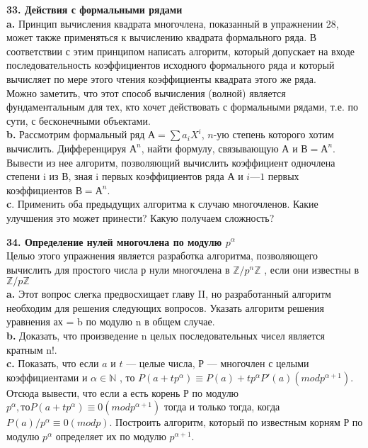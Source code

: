 \documentclass{mai_book}
\begin{document}
\noindent
\textbf{33. Действия с формальными рядами}\\

\textbf{a.} Принцип вычисления квадрата многочлена, показанный в упражнении 28, может также применяться к вычислению квадрата формального ряда. В соответствии с этим принципом написать алгоритм, который допускает на входе последовательность коэффициентов исходного формального ряда и который вычисляет по мере этого чтения коэффициенты квадрата этого же ряда.\\

Можно заметить, что этот способ вычисления (волной) является фундаментальным для тех, кто хочет действовать с формальными рядами, т.е. по сути, с бесконечными объектами.\\
\textbf{b.} Рассмотрим формальный ряд $А = \sum a_{i} X^{i}$, $n$-ую степень которого
хотим вычислить. Дифференцируя $А^{n}$, найти формулу, связывающую А и $В = А^{n}$. Вывести из нее алгоритм, позволяющий вычислить коэффициент одночлена степени i из В, зная i первых коэффициентов ряда А и $i — 1$ первых коэффициентов $В = А^{n}$.\\

\textbf{c}. Применить оба предыдущих алгоритма к случаю многочленов. Какие улучшения это может принести? Какую получаем сложность?
\newpage

\noindent
\textbf{34. Определение нулей многочлена по модулю $p^{\alpha}$ }\\

Целью этого упражнения является разработка алгоритма, позволяющего вычислить для простого числа р нули многочлена в $\mathbb{Z} / p^{n} \mathbb{Z}$ , если они известны в $\mathbb{Z} / p \mathbb{Z}$\\

\textbf{a.} Этот вопрос слегка предвосхищает главу II, но разработанный алгоритм необходим для решения следующих вопросов. Указать алгоритм решения уравнения ах = b по модулю n в общем случае.\\

\textbf{b.} Доказать, что произведение n целых последовательных чисел является кратным n!.\\

\textbf{c.} Показать, что если $a$ и $t$ — целые числа, Р — многочлен с целыми коэффициентами и $\alpha \in \mathbb{N}$ , то $P(a + tp^{\alpha}) \equiv P(a) + tp^{\alpha} P'(a) (mod p^{\alpha + 1})$. Отсюда вывести, что если а есть корень Р по модулю $p^{\alpha}, то P(a + tp^{\alpha}) \equiv 0 (mod p^{\alpha + 1})$ тогда и только тогда, когда $P(a)/p^{\alpha} \equiv 0 (mod p)$. Построить алгоритм, который по известным корням Р по модулю $p^{\alpha}$ определяет их по модулю $p^{\alpha + 1}$.\\
\end{document}
